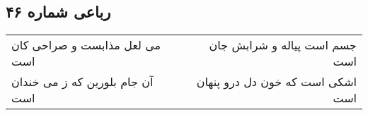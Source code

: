 \begin{center}
\section*{رباعی شماره ۴۶}
\label{sec:sh046}
\begin{longtable}{l p{0.5cm} r}
می لعل مذابست و صراحی کان است
&&
جسم است پیاله و شرابش جان است
\\
آن جام بلورین که ز می خندان است
&&
اشکی است که خون دل درو پنهان است
\\
\end{longtable}
\end{center}
